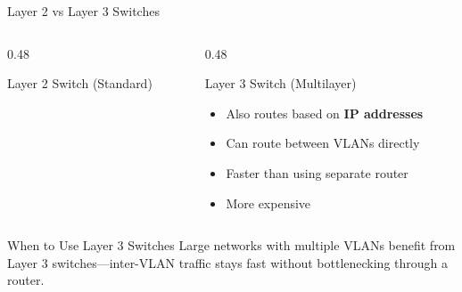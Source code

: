 \documentclass[aspectratio=169]{beamer}  %
\begin{document}
\begin{frame}{Layer 2 vs Layer 3 Switches}
\begin{columns}[T]
\begin{column}{0.48\textwidth}
\begin{block}{Layer 2 Switch (Standard)}
            \end{block}
        \end{column}
        \begin{column}{0.48\textwidth}
            \begin{block}{Layer 3 Switch (Multilayer)}
                \begin{itemize}
                    \item Also routes based on \textbf{IP addresses}
                    \item Can route between VLANs directly
                    \item Faster than using separate router
                    \item More expensive
                \end{itemize}
                
                \centering


            \end{block}
        \end{column}
    \end{columns}
    
    \vspace{0.3em}
    \begin{alertblock}{When to Use Layer 3 Switches}
        Large networks with multiple VLANs benefit from Layer 3 switches---inter-VLAN traffic stays fast without bottlenecking through a router.
    \end{alertblock}
\end{frame}
\end{document}
